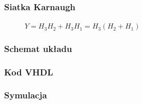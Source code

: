 \documentclass[a4paper,12pt]{extarticle}  %
\begin{document}
\subsubsection{Siatka Karnaugh}

\begin{figure}[H]
	\centering
	\begin{minipage}[c]{0.49\linewidth}
	\begin{karnaugh-map}[4][4][1][$H_1H_0$][$H_3H_2$]
	\autoterms[-] %
	\end{karnaugh-map}
	\centering
	\vspace{-1cm}
	\hspace{1cm}
	\caption*{$Y = H_3H_2 + H_3H_1 = H_3(H_2+H_1)$}
	\end{minipage}
\end{figure}

\subsubsection{Schemat układu}
\begin{figure}[H]
	\centering
\end{figure}
\subsubsection{Kod VHDL}

\subsubsection{Symulacja}
\begin{figure}[H]
	\centering
\end{figure}
\end{document}
